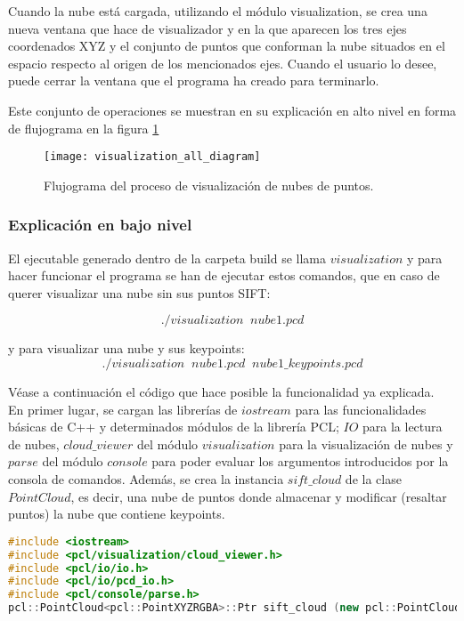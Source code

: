 Cuando la nube está cargada, utilizando el módulo visualization, se crea una nueva ventana que hace de visualizador y en la que aparecen los tres ejes coordenados XYZ y el conjunto de puntos que conforman la nube situados en el espacio respecto al origen de los mencionados ejes. Cuando el usuario lo desee, puede cerrar la ventana que el programa ha creado para terminarlo.

Este conjunto de operaciones se muestran en su explicación en alto nivel en forma de flujograma en la figura \ref{fig:visualization_all_diagram}

\begin{figure}
\centering
\texttt{[image: visualization\_all\_diagram]}
\caption{Flujograma del proceso de visualización de nubes de puntos.}\label{fig:visualization_all_diagram}
\end{figure}


\subsubsection{Explicación en bajo nivel}
El ejecutable generado dentro de la carpeta build se llama $visualization$ y para hacer funcionar el programa se han de ejecutar estos comandos, que en caso de querer visualizar una nube sin sus puntos SIFT:

$$./visualization \;\; nube1.pcd$$

y para visualizar una nube y sus keypoints:
$$./visualization \;\; nube1.pcd \;\; nube1\_keypoints.pcd$$

Véase a continuación el código que hace posible la funcionalidad ya explicada.\\

En primer lugar, se cargan las librerías de $iostream$ para las funcionalidades básicas de C++ y determinados módulos de la librería PCL; $IO$ para la lectura de nubes, $cloud\_viewer$ del módulo $visualization$ para la visualización de nubes y $parse$ del módulo $console$ para poder evaluar los argumentos introducidos por la consola de comandos.
Además, se crea la instancia $sift\_cloud$ de la clase $PointCloud$, es decir, una nube de puntos donde almacenar y modificar (resaltar puntos) la nube que contiene keypoints.

\begin{lstlisting}[language=C++,breaklines]
#include <iostream>
#include <pcl/visualization/cloud_viewer.h>
#include <pcl/io/io.h>
#include <pcl/io/pcd_io.h>
#include <pcl/console/parse.h>
pcl::PointCloud<pcl::PointXYZRGBA>::Ptr sift_cloud (new pcl::PointCloud<pcl::PointXYZRGBA>);
\end{lstlisting}

